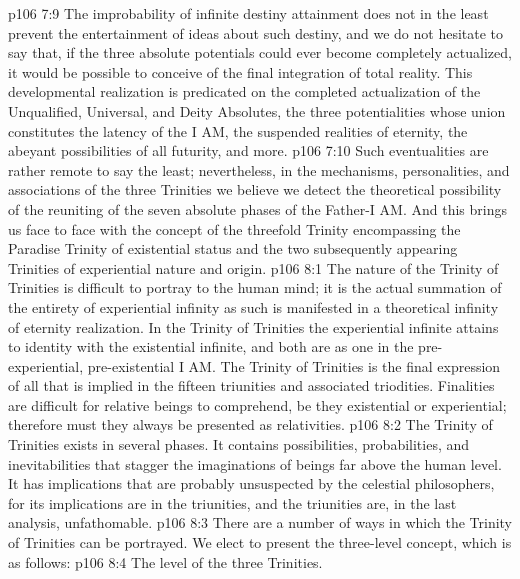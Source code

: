 \pc \vs p106 7:9 The improbability of infinite destiny attainment does not in the least prevent the entertainment of ideas about such destiny, and we do not hesitate to say that, if the three absolute potentials could ever become completely actualized, it would be possible to conceive of the final integration of total reality. This developmental realization is predicated on the completed actualization of the Unqualified, Universal, and Deity Absolutes, the three potentialities whose union constitutes the latency of the I AM, the suspended realities of eternity, the abeyant possibilities of all futurity, and more.
\vs p106 7:10 Such eventualities are rather remote to say the least; nevertheless, in the mechanisms, personalities, and associations of the three Trinities we believe we detect the theoretical possibility of the reuniting of the seven absolute phases of the Father\hyp{}I AM. And this brings us face to face with the concept of the threefold Trinity encompassing the Paradise Trinity of existential status and the two subsequently appearing Trinities of experiential nature and origin.
%
\vs p106 8:1 The nature of the Trinity of Trinities is difficult to portray to the human mind; it is the actual summation of the entirety of experiential infinity as such is manifested in a theoretical infinity of eternity realization. In the Trinity of Trinities the experiential infinite attains to identity with the existential infinite, and both are as one in the pre\hyp{}experiential, pre\hyp{}existential I AM. The Trinity of Trinities is the final expression of all that is implied in the fifteen triunities and associated triodities. Finalities are difficult for relative beings to comprehend, be they existential or experiential; therefore must they always be presented as relativities.
\vs p106 8:2 The Trinity of Trinities exists in several phases. It contains possibilities, probabilities, and inevitabilities that stagger the imaginations of beings far above the human level. It has implications that are probably unsuspected by the celestial philosophers, for its implications are in the triunities, and the triunities are, in the last analysis, unfathomable.
\vs p106 8:3 There are a number of ways in which the Trinity of Trinities can be portrayed. We elect to present the three\hyp{}level concept, which is as follows:
\pc \vs p106 8:4 \bibnobreakspace The level of the three Trinities.
